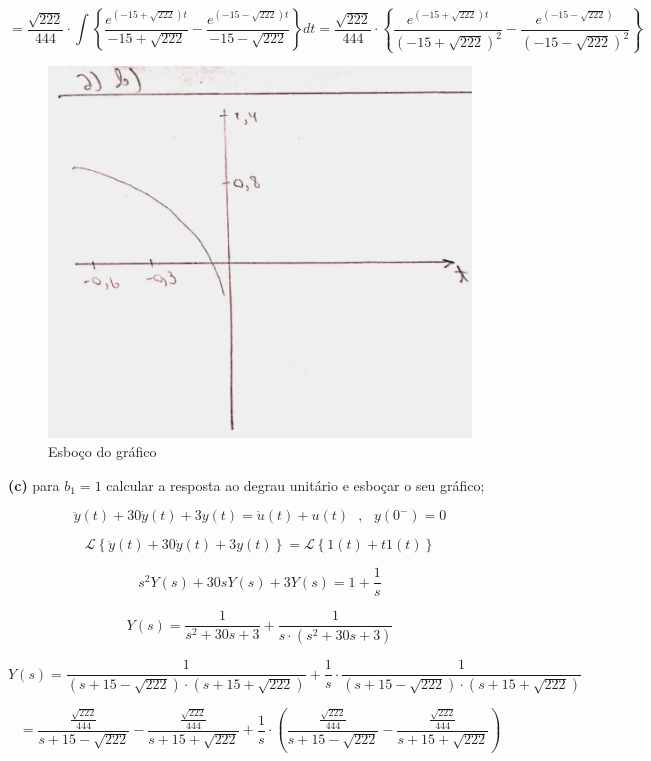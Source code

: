 \documentclass{article}
\begin{document}
\[ = \frac{\sqrt{222}}{444} \cdot \int \left\{ \frac{e^{(-15+\sqrt{222})t}}{-15+\sqrt{222}} - \frac{e^{(-15-\sqrt{222})t}}{-15-\sqrt{222}} \right\} dt = \frac{\sqrt{222}}{444} \cdot \left\{ \frac{e^{(-15+\sqrt{222})t}}{(-15+\sqrt{222})^{2}} - \frac{e^{(-15-\sqrt{222})}}{(-15-\sqrt{222})^{2}} \right\} \]

\begin{figure}[h]
    \includegraphics[scale=0.21]{Q2_b.png}
    \centering
    \caption{Esboço do gráfico}
\end{figure}

\vspace{\baselineskip}

\textbf{(c)} para $b_1 = 1$ calcular a resposta ao degrau unitário e esboçar o seu gráfico;

\[\ddot{y}(t) + 30\dot{y}(t) + 3y(t) = \dot{u}(t) + u(t)\,\,\,\,,\,\,\,\,y(0^{-}) = 0\]

\[\mathcal{L} \left\{\ddot{y}(t) + 30\dot{y}(t) + 3y(t)\right\} = \mathcal{L} \left\{1(t) + t1(t)\right\}\]

\[ s^{2}Y(s) + 30sY(s) + 3Y(s) = 1 + \frac{1}{s} \]

\[Y(s) = \frac{1}{s^{2} + 30s + 3} + \frac{1}{s \cdot (s^{2} + 30s + 3)}\]

\[ Y(s) = \frac{1}{(s + 15 - \sqrt{222}) \cdot (s + 15 + \sqrt{222})} + \frac{1}{s} \cdot \frac{1}{(s + 15 - \sqrt{222}) \cdot (s + 15 + \sqrt{222})}\]

\[ = \frac{ \frac{\sqrt{222}}{444}}{s + 15 - \sqrt{222}} - \frac{\frac{\sqrt{222}}{444}}{s + 15 + \sqrt{222}} + \frac{1}{s} \cdot \left(\frac{ \frac{\sqrt{222}}{444}}{s + 15 - \sqrt{222}} - \frac{\frac{\sqrt{222}}{444}}{s + 15 + \sqrt{222}}\right) \]
\end{document}

